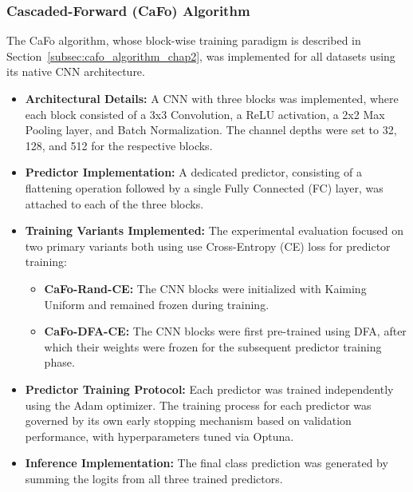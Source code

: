 \subsubsection{Cascaded-Forward (CaFo) Algorithm}
\label{subsec:methodology_cafo}
The CaFo algorithm, whose block-wise training paradigm is described in Section~\ref{subsec:cafo_algorithm_chap2}, was implemented for all datasets using its native CNN architecture.
\begin{itemize}
    \item \textbf{Architectural Details:} A CNN with three blocks was implemented, where each block consisted of a 3x3 Convolution, a ReLU activation, a 2x2 Max Pooling layer, and Batch Normalization. The channel depths were set to 32, 128, and 512 for the respective blocks.
    \item \textbf{Predictor Implementation:} A dedicated predictor, consisting of a flattening operation followed by a single Fully Connected (FC) layer, was attached to each of the three blocks.
    \item \textbf{Training Variants Implemented:} The experimental evaluation focused on two primary variants both using use Cross-Entropy (CE) loss for predictor training:
        \begin{itemize}
            \item \textbf{CaFo-Rand-CE:} The CNN blocks were initialized with Kaiming Uniform and remained frozen during training.
            \item \textbf{CaFo-DFA-CE:} The CNN blocks were first pre-trained using DFA, after which their weights were frozen for the subsequent predictor training phase.
        \end{itemize}
    \item \textbf{Predictor Training Protocol:} Each predictor was trained independently using the Adam optimizer. The training process for each predictor was governed by its own early stopping mechanism based on validation performance, with hyperparameters tuned via Optuna.
    \item \textbf{Inference Implementation:} The final class prediction was generated by summing the logits from all three trained predictors.
\end{itemize}

